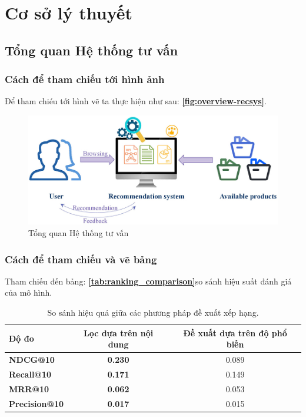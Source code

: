 \chapter{Cơ sở lý thuyết}

\section{Tổng quan Hệ thống tư vấn}

\subsection{Cách để tham chiếu tới hình ảnh}
Để tham chiéu tới hình vẽ ta thực hiện như sau: \textbf{ \autoref{fig:overview-recsys}}.

\begin{figure}
    \centering
    \includegraphics[width=0.7\linewidth]{images/overview_recsys.jpg}
    \caption{Tổng quan Hệ thống tư vấn}
    \label{fig:overview-recsys}
\end{figure}


\subsection{Cách để tham chiếu và vẽ bảng}

Tham chiếu đến bảng: \textbf{\autoref{tab:ranking_comparison}}so sánh hiệu suất đánh giá của mô hình.

\begin{table}[h!]
    \centering
    \caption{So sánh hiệu quả giữa các phương pháp đề xuất xếp hạng.}
    \label{tab:ranking_comparison}
    \begin{tabular}{lcc}
        \toprule
        \textbf{Độ đo} & \textbf{Lọc dựa trên nội dung} & \textbf{Đề xuất dựa trên độ phổ biến} \\
        \midrule
        \textbf{NDCG@10}  & \textbf{0.230} & 0.089 \\
        \textbf{Recall@10} & \textbf{0.171} & 0.149 \\
        \textbf{MRR@10}    & \textbf{0.062} & 0.053 \\
        \textbf{Precision@10}& \textbf{0.017} & 0.015 \\
        \bottomrule
    \end{tabular}
\end{table}
